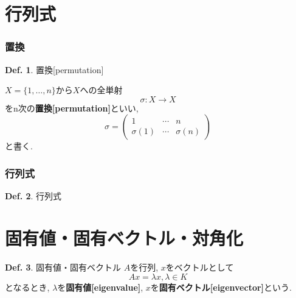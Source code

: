 \documentclass[a4paper,10pt,report]{amsart}
\theoremstyle{plain}
\theoremstyle{definition}
\newtheorem{defn}{Def.}[section]
\theoremstyle{remark}
\begin{document}
\part{行列式}
\section{置換}
\begin{leftbar}
    \begin{defn}置換[permutation]\par
        \(X=\{1,\dots,n\} \)から\(X\)への全単射
        \begin{equation}
            \sigma:X\to X
        \end{equation}
        をn次の\textbf{置換[permutation]}といい, 
        \begin{equation}
            \sigma=
            \begin{pmatrix}
                1 & \cdots & n\\ 
                \sigma(1) & \cdots & \sigma(n)
            \end{pmatrix}
        \end{equation}
        と書く. 
    \end{defn}
\end{leftbar}
\section{行列式}
\begin{leftbar}
    \begin{defn}行列式\par
        
    \end{defn}
\end{leftbar}
\part{固有値・固有ベクトル・対角化}
\begin{leftbar}
    \begin{defn}固有値・固有ベクトル
        \(A\)を行列, \(x\)をベクトルとして
        \begin{equation}
            Ax=\lambda x,\lambda\in K
        \end{equation}
        となるとき, \(\lambda{}\)を\textbf{固有値[eigenvalue]}, 
        \(x\)を\textbf{固有ベクトル[eigenvector]}という. 
    \end{defn}
\end{leftbar}
\end{document}
